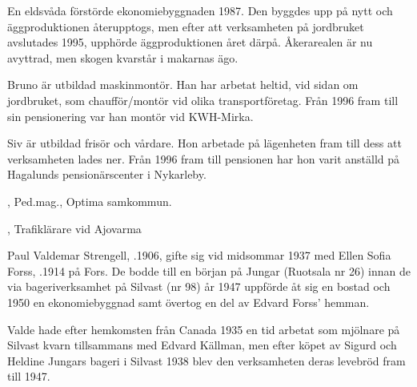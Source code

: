 En eldsvåda förstörde ekonomiebyggnaden 1987. Den byggdes upp på nytt och äggproduktionen återupptogs, men efter att verksamheten på jordbruket avslutades 1995, upphörde äggproduktionen året därpå. Åkerarealen är nu avyttrad, men skogen kvarstår i makarnas ägo.

Bruno är utbildad maskinmontör. Han har arbetat heltid, vid sidan om jordbruket, som chaufför/montör vid olika transportföretag. Från 1996 fram till sin pensionering var han montör vid KWH-Mirka.

Siv är utbildad frisör och vårdare. Hon arbetade på lägenheten fram till dess att verksamheten lades ner. Från 1996 fram till pensionen har hon varit anställd på Hagalunds pensionärscenter i Nykarleby.
\begin{jhchildren}
  \item {}, Ped.mag., Optima samkommun.
  \item {}, Trafiklärare vid Ajovarma
\end{jhchildren}


Paul Valdemar Strengell, .1906, gifte sig vid midsommar 1937 med Ellen Sofia Forss, .1914 på Fors. De bodde till en början på Jungar (Ruotsala nr 26) innan de via bageriverksamhet på Silvast (nr 98) år 1947 uppförde åt sig en bostad och 1950 en ekonomiebyggnad samt övertog en del av Edvard Forss' hemman.

Valde hade efter hemkomsten från Canada 1935 en tid arbetat som mjölnare på Silvast kvarn tillsammans med Edvard Källman, men efter köpet av Sigurd och Heldine Jungars bageri i Silvast 1938 blev den verksamheten deras levebröd fram till 1947.
\begin{jhchildren}
  \item {}
  \item {}
  \item {}
  \item {}
  \item {}
  \item {}
\end{jhchildren}

